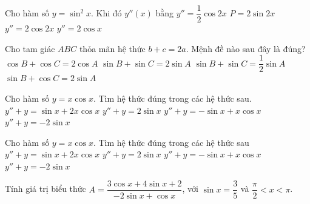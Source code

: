 \begin{ex}%
	Cho hàm số $y=\sin^2x$. Khi đó  $y''(x)$ bằng
	\choice 
		{$y''=\dfrac{1}{2}\cos 2x$} 
		{$P=2\sin  2x$}
		{\True  $y''=2\cos 2x$}
		{$y''=2\cos  x$}
\end{ex}

\begin{ex}%
	Cho tam giác $ABC$ thỏa  mãn hệ thức $b+c=2a$. Mệnh đề nào sau đây là đúng?
	\choice 
		{$\cos B+\cos C=2\cos A$} 
		 {\True $\sin B+\sin C=2\sin A$}
		{$\sin B+\sin C=\dfrac{1}{2}\sin A$} 
		 {$\sin B+\cos C=2\sin A$}
\end{ex}

\begin{ex}%
	 Cho hàm số $y=x\cos x$. Tìm hệ thức đúng trong các hệ thức sau.
	 \choice
		{$y''+y=\sin x+2x\cos x$} 
		 {$y''+y=2\sin x$}
		{$y''+y=-\sin  x+x\cos x$}
		{\True  $y''+y=-2\sin x$}
\end{ex}

\begin{ex}%
	Cho hàm số $ y=x\cos x$. Tìm hệ thức đúng trong các hệ thức sau 
	\choice 
		{$y''+y=\sin x+2x\cos x$} 
		{$y''+y=2\sin x$} 
		{$y''+y=-\sin  x+x\cos x$}
		{\True  $y''+y=-2\sin x$}
\end{ex}

\begin{bt}%

	Tính giá trị biểu thức $A=\dfrac{3\cos x+4\sin x +2}{-2\sin x+\cos x}$, với $\sin x=\dfrac{3}{5}$ và $\dfrac{\pi}{2}<x<\pi$.
\end{bt}

